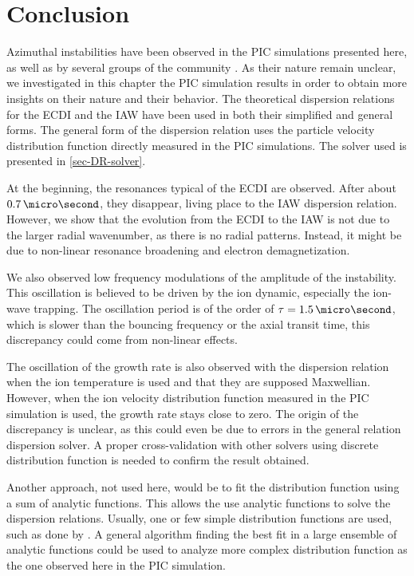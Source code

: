 
\section{Conclusion}
  Azimuthal instabilities have been observed in the \ac{PIC} simulations presented here, as well as by several groups of the community \citep{hara2019a,janhunen2018,taccogna2019}.
  As their nature remain unclear, we investigated in this chapter the \ac{PIC} simulation results in order to obtain more insights on their nature and their behavior.
  The theoretical dispersion relations for the \ac{ECDI} and the \ac{IAW} have been used in both their simplified and general forms.
  The general form of the dispersion relation uses the particle velocity distribution function directly measured in the \ac{PIC} simulations.
  The solver used is presented in \cref{sec-DR-solver}.
  
  At the beginning, the resonances typical of the \ac{ECDI} are observed.
  After about $0.7\,\micro\second$, they disappear, living place to the \ac{IAW} dispersion relation.
    However, we show that the evolution from the \ac{ECDI} to the \ac{IAW}  is not due to the larger radial wavenumber, as there is no radial patterns.
  Instead, it might be due to non-linear resonance broadening and electron demagnetization.
  
  \vspace{1ex}
  We also observed low frequency modulations of the amplitude of the instability.
  This oscillation is believed to be driven by the ion dynamic, especially the ion-wave trapping.
  The oscillation period is of the order of $\tau=1.5\,\micro\second$, which is slower than the bouncing frequency or the axial transit time, this discrepancy could come from non-linear effects.
  
  The oscillation of the growth rate is also observed with the dispersion relation when the ion temperature is used and that they are supposed Maxwellian.
  However, when the ion velocity distribution function measured in the \ac{PIC}  simulation is used, the growth rate stays close to zero.
  The origin of the discrepancy is unclear, as this could even be due to errors in the general relation dispersion solver.
  A proper cross-validation with other solvers using discrete distribution function is needed to confirm the result obtained.
  
  Another approach, not used here, would be to fit the distribution function using a sum of analytic functions.
  This allows the use analytic functions to solve the dispersion relations.
  Usually, one or few simple distribution functions are used, such as done by \citet{ronnmark1982}.
  A general algorithm finding the best fit in a large ensemble of analytic functions could be used to analyze more complex distribution function as the one observed here in the PIC simulation.

